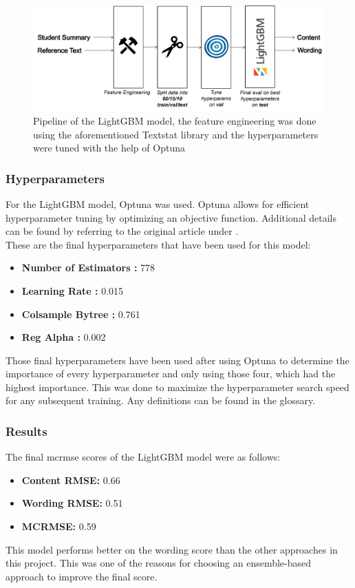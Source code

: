 \begin{figure}[H]
\includegraphics[keepaspectratio, width=\textwidth]{img/lightgbm-architecture.png}
\caption[Pipeline of the LightGBM Model]{Pipeline of the LightGBM model, the feature engineering was done using the aforementioned Textstat library and the hyperparameters were tuned with the help of Optuna}
\label{fig:lightgbm-model}
\end{figure}

\subsubsection{Hyperparameters}

For the LightGBM model, Optuna was used. Optuna allows for efficient hyperparameter tuning by optimizing an objective function. Additional details can be found by referring to the original article under \cite{10.1145/3292500.3330701}.\\

\noindent These are the final hyperparameters that have been used for this model:

\begin{itemize}
	\item \textbf{Number of Estimators
:} 778
	\item \textbf{Learning Rate
:} 0.015
	\item \textbf{Colsample Bytree
:} 0.761
	\item \textbf{Reg Alpha
:} 0.002
\end{itemize}

\noindent Those final hyperparameters have been used after using Optuna to determine the importance of every hyperparameter and only using those four, which had the highest importance. This was done to maximize the hyperparameter search speed for any subsequent training. Any definitions can be found in the glossary.

\subsubsection{Results}

The final \gls{mcrmse} scores of the LightGBM model were as follows:

\begin{itemize}
	\item \textbf{Content RMSE:} 0.66
	\item \textbf{Wording RMSE:} 0.51
	\item \textbf{MCRMSE:} 0.59
\end{itemize}

\noindent This model performs better on the wording score than the other approaches in this project. This was one of the reasons for choosing an ensemble-based approach to improve the final score.
